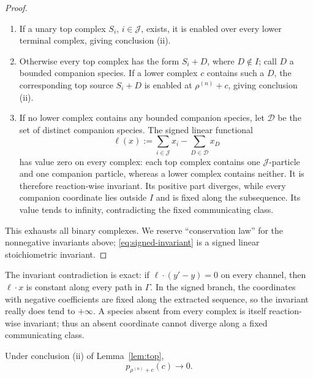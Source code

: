 \begin{proof}
\begin{enumerate}[label=\textup{(\alph*)},leftmargin=2.5em]
\item If a unary top complex \(S_i\), \(i\in\mathcal J\), exists, it is enabled
      over every lower terminal complex, giving conclusion (ii).
\item Otherwise every top complex has the form \(S_i+D\), where
      \(D\notin I\); call \(D\) a bounded companion species.  If a lower complex
      \(c\) contains such a \(D\), the corresponding top source \(S_i+D\)
      is enabled at \(\rho^{(n)}+c\), giving conclusion (ii).
\item If no lower complex contains any bounded companion species, let
      \(\mathcal D\) be the set of distinct companion species.  The signed
      linear functional
      \begin{equation}\label{eq:signed-invariant}
        \ell(x):=\sum_{i\in\mathcal J}x_i-\sum_{D\in\mathcal D}x_D
      \end{equation}
      has value zero on every complex: each top complex contains one
      \(\mathcal J\)-particle and one companion particle, whereas a lower
      complex contains neither.  It is therefore reaction-wise invariant.  Its
      positive part diverges, while every companion coordinate lies outside
      \(I\) and is fixed along the subsequence.  Its value tends to infinity,
      contradicting the fixed communicating class.
\end{enumerate}

This exhausts all binary complexes.  We reserve ``conservation law'' for the
nonnegative invariants above; \eqref{eq:signed-invariant} is a signed linear
stoichiometric invariant.
\end{proof}

The invariant contradiction is exact: if \(\ell\cdot(y'-y)=0\) on every
channel, then \(\ell\cdot x\) is constant along every path in \(\Gamma\).
In the signed branch, the coordinates with negative coefficients are fixed along
the extracted sequence, so the invariant really does tend to \(+\infty\).
A species absent from every complex is itself reaction-wise invariant; thus an
absent coordinate cannot diverge along a fixed communicating class.

\begin{lemma}\label{lem:terminal}
Under conclusion \textup{(ii)} of Lemma~\ref{lem:top},
\begin{equation}\label{eq:terminal-zero}
  p_{\rho^{(n)}+c}(c)\longrightarrow0.
\end{equation}
\end{lemma}


